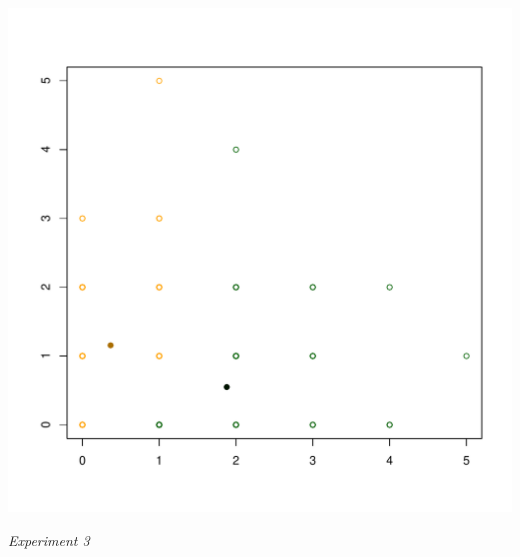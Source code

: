 \documentclass[a4paper,12pt]{article}
\begin{document}
\begin{center}
  \includegraphics[width=0.6\linewidth]{Image/ProbEC2-3.pdf}
  
  \small\textit{Experiment 3}
\end{center}
















\end{document}
